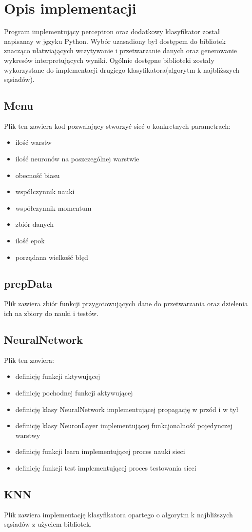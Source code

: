 \documentclass{classrep}
\begin{document}
	\section{Opis implementacji}
	{
		Program implementujący perceptron oraz dodatkowy klasyfikator został napisanay w języku Python. Wybór uzasadiony był dostępem do bibliotek znacząco ułatwiających wczytywanie i przetwarzanie danych oraz generowanie wykresów interpretujących wyniki. Ogólnie dostępne biblioteki zostały wykorzystane do implementacji drugiego klasyfikatora(algorytm k najbliższych sąsiadów).
		\subsection{Menu}
		Plik ten zawiera kod pozwalający stworzyć sieć o konkretnych parametrach:
		\begin{itemize}
			\item ilość warstw
			\item ilość neuronów na poszczególnej warstwie
			\item obecność biasu
			\item współczynnik nauki
			\item współczynnik momentum
			\item zbiór danych
			\item ilość epok
			\item porządana wielkość błęd
		\end{itemize}
		\subsection{prepData}
		Plik zawiera zbiór funkcji przygotowujących dane do przetwarzania oraz dzielenia ich na zbiory do nauki i testów.
		\subsection{NeuralNetwork}
		Plik ten zawiera:
		\begin{itemize}
			\item definicję funkcji aktywującej
			\item definicję pochodnej funkcji aktywującej
			\item definicję klasy NeuralNetwork implementującej propagację w przód i w tył
			\item definicję klasy NeuronLayer implementującej funkcjonalność pojedynczej warstwy
			\item definicję funkcji learn implementującej proces nauki sieci
			\item definicję funkcji test implementującej proces testowania sieci
		\end{itemize}
		\subsection{KNN}
		Plik zawiera implementację klasyfikatora opartego o algorytm k najbliższych sąsiadów z użyciem bibliotek.
	}
	
\end{document}
